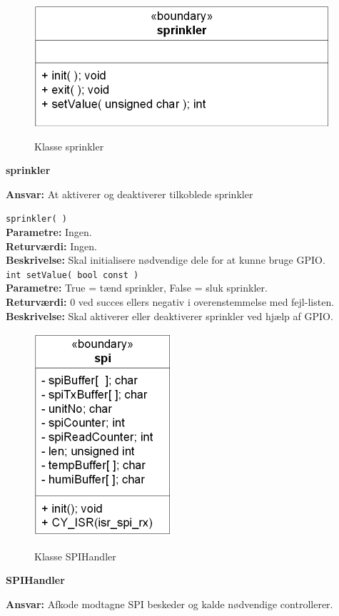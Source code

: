 \begin{figure}[htbp] \centering
{\includegraphics[scale=1.3]{filer/design/Klassediagrammer/sw_psoc_sprinkler}}
\caption{Klasse sprinkler}
\label{fig:sw_psoc_class_sprinkler}
\end{figure} 

{\centering
\textbf{sprinkler}\par
}
\textbf{Ansvar:} At aktiverer og deaktiverer tilkoblede sprinkler \

\verb+sprinkler( )+ \\
\textbf{Parametre:} Ingen. \\
\textbf{Returværdi:} Ingen. \\
\textbf{Beskrivelse:} Skal initialisere nødvendige dele for at kunne bruge GPIO.\\

\verb+int setValue( bool const )+ \\
\textbf{Parametre:} True = tænd sprinkler, False = sluk sprinkler. \\
\textbf{Returværdi:} 0 ved succes ellers negativ i overenstemmelse med fejl-listen. \\
\textbf{Beskrivelse:} Skal aktiverer eller deaktiverer sprinkler ved hjælp af GPIO.\\

\begin{figure}[htbp] \centering
{\includegraphics[scale=1.3]{filer/design/Klassediagrammer/sw_psoc_SPIhandler}}
\caption{Klasse SPIHandler}
\label{fig:sw_psoc_class_SPIhandler}
\end{figure} 

{\centering
\textbf{SPIHandler}\par
}
\textbf{Ansvar:} Afkode modtagne SPI beskeder og kalde nødvendige controllerer. \
